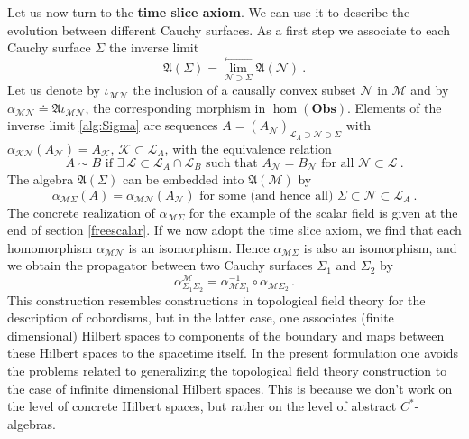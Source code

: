 \documentclass[11pt]{article}
\newcommand{\fA}{\mathfrak{A}}
\newcommand{\Lcal}{\mathcal {L}}
\newcommand{\Kcal}{\mathcal{K}}
\newcommand{\Ncal}{\mathcal{N}}
\newcommand{\Mcal}{\mathcal{M}}
\newcommand{\Obs}{\mathrm{\mathbf{Obs}}}       %
\newcommand{\al}{\alpha}
\newcommand{\1}{\mathds{1}}                         %
\newcommand{\be}{\begin{equation}}
\newcommand{\ee}{\end{equation}}
\begin{document}
Let us now turn to the \textbf{time slice axiom}. We can use it to describe the evolution between different Cauchy surfaces. As a first step we associate to each Cauchy surface $\Sigma$ the inverse limit
\be\label{alg:Sigma}
\mathfrak{A}(\Sigma)=\lim^{\leftarrow}_{\Ncal\supset \Sigma}\mathfrak{A}(\Ncal)\ .
\ee
Let  us denote by $\iota_{\Mcal\Ncal}$ the inclusion of a causally convex subset $\Ncal$ in $\Mcal$ and by $\al_{\Mcal\Ncal}\doteq\fA\iota_{\Mcal\Ncal}$, the corresponding morphism in $\hom(\Obs)$. Elements of the inverse limit \eqref{alg:Sigma} are sequences $A=(A_\Ncal)_{\Lcal_A\supset \Ncal\supset \Sigma}$ with $\alpha_{\Kcal\Ncal}(A_\Ncal)=A_\Kcal$, $\Kcal\subset \Lcal_A$, with the equivalence relation
\be
A\sim B \text{ if }\exists\ \Lcal\subset \Lcal_A\cap \Lcal_{B}\text{ such that }A_\Ncal=B_\Ncal \text{ for all }\Ncal\subset \Lcal\ . 
\ee
The algebra $\mathfrak{A}(\Sigma)$ can be embedded into $\mathfrak{A}(\Mcal)$ by
\be\label{MSig}
\alpha_{\Mcal\Sigma}(A)=\alpha_{\Mcal\Ncal}(A_\Ncal) \text{ for some (and hence all) }\Sigma\subset \Ncal\subset \Lcal_A\ .
\ee
The concrete realization of $\al_{\Mcal\Sigma}$ for the example of the scalar field is given at the end of section \ref{freescalar}. If we now adopt the time slice axiom, we find that each homomorphism $\alpha_{\Mcal\Ncal}$ is an isomorphism. Hence $\alpha_{\Mcal\Sigma}$ is also an isomorphism, and we obtain the propagator between two Cauchy surfaces $\Sigma_1$ and $\Sigma_2$ by
\be
\alpha^\Mcal_{\Sigma_1\Sigma_2}=\alpha_{\Mcal\Sigma_1}^{-1}\circ\alpha_{\Mcal\Sigma_2}\,.
\ee
This construction resembles constructions in topological field theory for the description of cobordisms, but in the latter case, one associates (finite dimensional) Hilbert spaces to components of the boundary and maps between these Hilbert spaces to the spacetime itself. In the present formulation one avoids the problems related to generalizing the topological field theory construction to the case of infinite dimensional Hilbert spaces. This is because we don't work on the level of concrete Hilbert spaces, but rather on the level of abstract $C^*$-algebras. 
\end{document}
